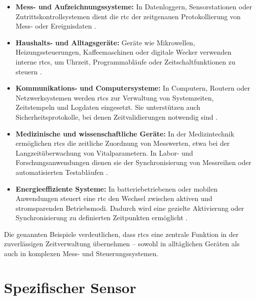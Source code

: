 \begin{itemize}
	\item \textbf{Mess- und Aufzeichnungssysteme:} 
	In Datenloggern, Sensorstationen oder Zutrittskontrollsystemen dient die \ac{rtc} der zeitgenauen Protokollierung von Mess- oder Ereignisdaten \cite{TexasInstruments:2022}.

	
	\item \textbf{Haushalts- und Alltagsgeräte:} 
	Geräte wie Mikrowellen, Heizungssteuerungen, Kaffeemaschinen oder digitale Wecker verwenden interne \acp{rtc}, 
	um Uhrzeit, Programmabläufe oder Zeitschaltfunktionen zu steuern \cite{congatec:2017}.

	
	\item \textbf{Kommunikations- und Computersysteme:} 
	In Computern, Routern oder Netzwerksystemen werden \acp{rtc} zur Verwaltung von Systemzeiten, Zeitstempeln und Logdaten eingesetzt. 
	Sie unterstützen auch Sicherheitsprotokolle, bei denen Zeitvalidierungen notwendig sind \cite{MicroCrystal:2023}.


	\item \textbf{Medizinische und wissenschaftliche Geräte:} 
	In der Medizintechnik ermöglichen \acp{rtc} die zeitliche Zuordnung von Messwerten, etwa bei der Langzeitüberwachung von Vitalparametern. 
	In Labor- und Forschungsanwendungen dienen sie der Synchronisierung von Messreihen oder automatisierten Testabläufen \cite{congatec:2017}.

	
	\item \textbf{Energieeffiziente Systeme:} 
	In batteriebetriebenen oder mobilen Anwendungen steuert eine \ac{rtc} den Wechsel zwischen aktiven und stromsparenden Betriebsmodi. 
	Dadurch wird eine gezielte Aktivierung oder Synchronisierung zu definierten Zeitpunkten ermöglicht \cite{congatec:2017}.

\end{itemize}

Die genannten Beispiele verdeutlichen, dass \acp{rtc} eine zentrale Funktion in der zuverlässigen Zeitverwaltung übernehmen -- sowohl in alltäglichen Geräten als auch in komplexen Mess- und Steuerungssystemen.









\section{Spezifischer Sensor}
\label{sec:RTC_DS3231}

